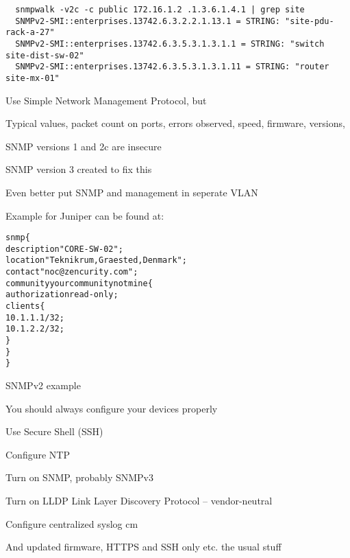 \documentclass[Screen16to9,17pt]{foils}
\begin{document}

\begin{verbatim}
  snmpwalk -v2c -c public 172.16.1.2 .1.3.6.1.4.1 | grep site
  SNMPv2-SMI::enterprises.13742.6.3.2.2.1.13.1 = STRING: "site-pdu-rack-a-27"
  SNMPv2-SMI::enterprises.13742.6.3.5.3.1.3.1.1 = STRING: "switch site-dist-sw-02"
  SNMPv2-SMI::enterprises.13742.6.3.5.3.1.3.1.11 = STRING: "router site-mx-01"
\end{verbatim}

Use Simple Network Management Protocol, but
\begin{list2}
\item Typical values, packet count on ports, errors observed, speed, firmware, versions,
\item SNMP versions 1 and 2c are insecure
\item SNMP version 3 created to fix this
\item Even better put SNMP and management in seperate VLAN
\end{list2}

Example for Juniper can be found at:\\
{\small{}}




\begin{alltt}
snmp \{
    description "CORE-SW-02";
    location "Teknikrum, Graested, Denmark";
    contact "noc@zencurity.com";
    community yourcommunitynotmine \{
        authorization read-only;
        clients \{
            10.1.1.1/32;
            10.1.2.2/32;
        \}
    \}
\}
\end{alltt}

SNMPv2 example







\begin{slidelist}
\item You should always configure your devices properly
\item Use Secure Shell (SSH)
\item Configure NTP
\item Turn on SNMP, probably SNMPv3
\item Turn on LLDP Link Layer Discovery Protocol -- vendor-neutral\\
{\small{}}
\item Configure centralized syslog
 cm
\item And updated firmware, HTTPS and SSH only etc. the usual stuff
\end{slidelist}
\end{document}
